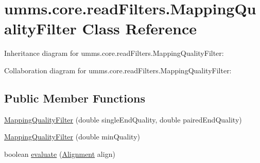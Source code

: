 \hypertarget{classumms_1_1core_1_1read_filters_1_1_mapping_quality_filter}{\section{umms.\+core.\+read\+Filters.\+Mapping\+Quality\+Filter Class Reference}
\label{classumms_1_1core_1_1read_filters_1_1_mapping_quality_filter}
}


Inheritance diagram for umms.\+core.\+read\+Filters.\+Mapping\+Quality\+Filter\+:


Collaboration diagram for umms.\+core.\+read\+Filters.\+Mapping\+Quality\+Filter\+:
\subsection*{Public Member Functions}
\begin{DoxyCompactItemize}
\item 
\hyperlink{classumms_1_1core_1_1read_filters_1_1_mapping_quality_filter_a3d2ff3f84d629fcf5fc1b9b73d0e0b46}{Mapping\+Quality\+Filter} (double single\+End\+Quality, double paired\+End\+Quality)
\item 
\hyperlink{classumms_1_1core_1_1read_filters_1_1_mapping_quality_filter_ae39107ede326cb9fd1e8f4263ebe4b2e}{Mapping\+Quality\+Filter} (double min\+Quality)
\item 
boolean \hyperlink{classumms_1_1core_1_1read_filters_1_1_mapping_quality_filter_a763b2e78ced74f96fc555596bd2bb021}{evaluate} (\hyperlink{interfaceumms_1_1core_1_1alignment_1_1_alignment}{Alignment} align)
\end{DoxyCompactItemize}


